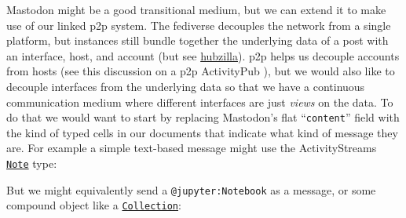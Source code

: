 Mastodon might be a good transitional medium, but we can extend it to
make use of our linked p2p system. The fediverse decouples the network
from a single platform, but instances still bundle together the
underlying data of a post with an interface, host, and account (but see
\href{https://hubzilla.org//page/hubzilla/hubzilla-project}{hubzilla}).
p2p helps us decouple accounts from hosts (see this discussion on a p2p
ActivityPub \citep{webberActivityPubDecentralizedDistributed2017} ), but we would also like to decouple interfaces from the underlying
data so that we have a continuous communication medium where different
interfaces are just \emph{views} on the data. To do that we would want
to start by replacing Mastodon's flat ``\texttt{content}'' field with
the kind of typed cells in our documents that indicate what kind of
message they are. For example a simple text-based message might use the
ActivityStreams
\href{https://www.w3.org/TR/activitystreams-vocabulary/\#dfn-note}{\texttt{Note}}
type:

\begin{Shaded}
\begin{Highlighting}[]
\FunctionTok{\{}
  \FunctionTok{:} \FunctionTok{,}
  \FunctionTok{:} \FunctionTok{,}
  \FunctionTok{:} \FunctionTok{,}
  \FunctionTok{:} 
\FunctionTok{\}}
\end{Highlighting}
\end{Shaded}

But we might equivalently send a \texttt{@jupyter:Notebook} as a
message, or some compound object like a
\href{https://www.w3.org/TR/activitystreams-vocabulary/\#dfn-collection}{\texttt{Collection}}:

\begin{Shaded}
\begin{Highlighting}[]
\FunctionTok{\{}
  \FunctionTok{:} \FunctionTok{,}
  \FunctionTok{:} \FunctionTok{,}
  \FunctionTok{:} \FunctionTok{,}
  \FunctionTok{:} \FunctionTok{,}
  \FunctionTok{:} \OtherTok{[}
    \FunctionTok{\{}
      \FunctionTok{:} \FunctionTok{,}
      \FunctionTok{:} 
    \FunctionTok{\}}
    \FunctionTok{\{}
      \FunctionTok{:} \FunctionTok{,}
      \FunctionTok{:} \FunctionTok{,}
      \FunctionTok{:} 
    \FunctionTok{\}}\OtherTok{,}
  \OtherTok{]}
\FunctionTok{\}}
\end{Highlighting}
\end{Shaded}


